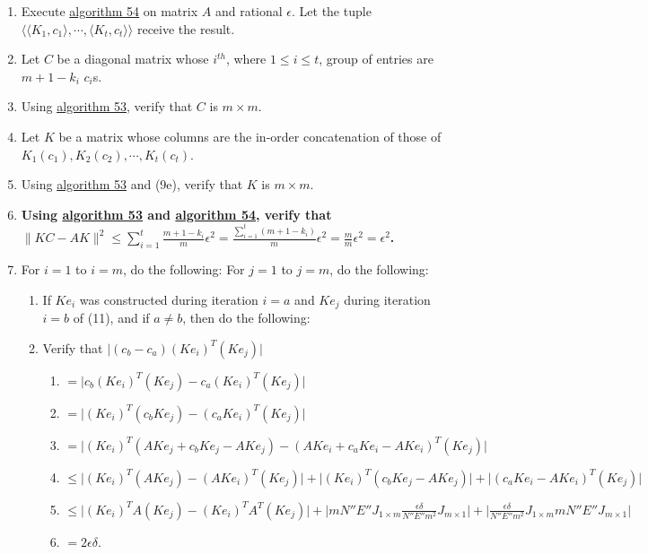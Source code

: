 \documentclass[twocolumn]{article}
\begin{document}
			\begin{enumerate}
				\item Execute \hyperref[sec:algorithm 54]{algorithm 54} on matrix $A$ and rational $\epsilon$. Let the tuple $\langle\langle K_1,c_1\rangle,\cdots,\langle K_t,c_t\rangle\rangle$ receive the result.
				\item Let $C$ be a diagonal matrix whose $i^{th}$, where $1\le i\le t$, group of entries are $m+1-k_i$ $c_i$s.
				\item Using \hyperref[sec:algorithm 53]{algorithm 53}, verify that $C$ is $m\times m$.
				\item Let $K$ be a matrix whose columns are the in-order concatenation of those of $K_1(c_1),K_2(c_2),\cdots,K_t(c_t)$.
				\item Using \hyperref[sec:algorithm 53]{algorithm 53} and (9e), verify that $K$ is $m\times m$.
				\item \textbf{Using \hyperref[sec:algorithm 53]{algorithm 53} and \hyperref[sec:algorithm 54]{algorithm 54}, verify that $\lVert KC-AK\rVert^2\le\sum_{i=1}^t\frac{m+1-k_i}{m}\epsilon^2=\frac{\sum_{i=1}^t (m+1-k_i)}{m}\epsilon^2=\frac{m}{m}\epsilon^2=\epsilon^2$.}
				\item For $i=1$ to $i=m$, do the following: For $j=1$ to $j=m$, do the following:
				\begin{enumerate}
					\item If $Ke_i$ was constructed during iteration $i=a$ and $Ke_j$ during iteration $i=b$ of (11), and if $a\ne b$, then do the following:
					\item Verify that $\lvert(c_b-c_a)(Ke_i)^T(Ke_j)\rvert$
					\begin{enumerate}
						\item $=\lvert c_b(Ke_i)^T(Ke_j)-c_a(Ke_i)^T(Ke_j)\rvert$
						\item $=\lvert(Ke_i)^T(c_bKe_j)-(c_aKe_i)^T(Ke_j)\rvert$
						\item $=\lvert(Ke_i)^T(AKe_j+c_bKe_j-AKe_j)-(AKe_i+c_aKe_i-AKe_i)^T(Ke_j)\rvert$
						\item $\le\lvert(Ke_i)^T(AKe_j)-(AKe_i)^T(Ke_j)\rvert+\lvert(Ke_i)^T(c_bKe_j-AKe_j)\rvert+\lvert(c_aKe_i-AKe_i)^T(Ke_j)\rvert$
						\item $\le\lvert(Ke_i)^TA(Ke_j)-(Ke_i)^TA^T(Ke_j)\rvert+\lvert mN''E''J_{1\times m}\frac{\epsilon\delta}{N''E''m^2}J_{m\times 1}\rvert+\lvert\frac{\epsilon\delta}{N''E''m^2}J_{1\times m}mN''E''J_{m\times 1}\rvert$
						\item $=2\epsilon\delta$.
					\end{enumerate}

\end{enumerate}
\end{enumerate}
\end{document}
